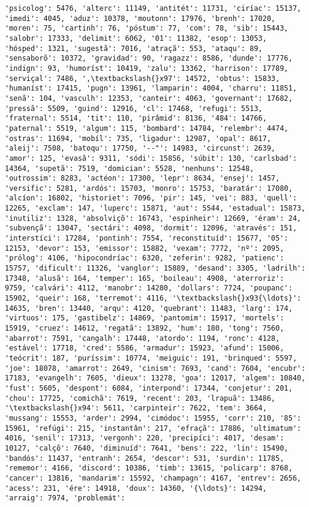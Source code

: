 \documentclass[11pt]{article}
\begin{document}
\begin{Verbatim}[commandchars=\\\{\}]
'psicolog': 5476, 'alterc': 11149, 'antitét': 11731, 'ciríac': 15137, 'imedi': 4045, 'aduz': 10378, 'moutonn': 17976, 'brenh': 17020, 'moren': 75, 'cartinh': 76, 'póstum': 77, 'com': 78, 'sib': 15443, 'salobr': 17333, 'delimit': 6062, '01': 11382, 'esop': 13053, 'hósped': 1321, 'sugestã': 7016, 'atraçã': 553, 'ataqu': 89, 'sensaborõ': 10372, 'gravidad': 90, 'ragazz': 8586, 'dunde': 17776, 'indign': 93, 'humoríst': 10419, 'zalu': 13362, 'harrison': 17789, 'serviçal': 7486, ',\textbackslash{}x97': 14572, 'obtus': 15833, 'humaníst': 17415, 'pugn': 13961, 'lamparin': 4004, 'charru': 11851, 'senã': 104, 'vasculh': 12353, 'canteir': 4063, 'governant': 17682, 'pressã': 5509, 'guind': 12916, 'cl': 17468, 'refugi': 5513, 'fraternal': 5514, 'tit': 110, 'pirâmid': 8136, '484': 14766, 'paternal': 5519, 'algum': 115, 'bombard': 14784, 'relembr': 4474, 'ostras': 11694, 'mobíl': 735, 'ligadur': 12987, 'opal': 8617, 'aleij': 7508, 'batoqu': 17750, '--"': 14983, 'circunst': 2639, 'amor': 125, 'evasã': 9311, 'sódi': 15856, 'súbit': 130, 'carlsbad': 14364, 'supetã': 7519, 'domician': 5528, 'nenhuns': 12548, 'outrossim': 8283, 'actéon': 17300, 'lepr': 8634, 'ensej': 1457, 'versific': 5281, 'ardós': 15703, 'monro': 15753, 'baratár': 17080, 'alcíon': 16802, 'historiet': 7096, 'pir': 145, 'vei': 883, 'quell': 12265, 'exclam': 147, 'luperc': 15871, 'aut': 5544, 'estadual': 15873, 'inutiliz': 1328, 'absolviçõ': 16743, 'espinheir': 12669, 'éram': 24, 'subvençã': 13047, 'sectári': 4098, 'dormit': 12096, 'através': 151, 'interstíci': 17284, 'pontinh': 7554, 'reconstituíd': 15677, '05': 12153, 'devor': 153, 'emissor': 15882, 'vexam': 7772, 'nº': 2095, 'prólog': 4106, 'hipocondríac': 6320, 'zeferin': 9282, 'patienc': 15757, 'dificult': 11326, 'vanglor': 15889, 'desand': 3305, 'ladrilh': 17348, 'alusã': 164, 'temper': 165, 'boileau': 4908, 'aterroriz': 9759, 'calvári': 4112, 'manobr': 14280, 'dollars': 7724, 'poupanc': 15902, 'queir': 168, 'terremot': 4116, '\textbackslash{}x93{\ldots}': 14635, 'bren': 13440, 'arqu': 4120, 'quebrant': 11483, 'larg': 174, 'virtuos': 175, 'gastibelz': 14869, 'pantomim': 15917, 'mortels': 15919, 'cruez': 14612, 'regatã': 13892, 'hum': 180, 'tong': 7560, 'abarrot': 7591, 'cangalh': 17448, 'atordo': 1194, 'ronc': 4128, 'estável': 17718, 'cred': 5586, 'armadur': 15923, 'afund': 15006, 'teócrit': 187, 'puríssim': 10774, 'meiguic': 191, 'brinqued': 5597, 'joe': 18078, 'amarrot': 2649, 'cinism': 7693, 'cand': 7604, 'encubr': 17183, 'evangelh': 7605, 'dieux': 13278, 'goa': 12017, 'algem': 10840, 'fust': 5605, 'despont': 6084, 'interpond': 17344, 'conjetur': 201, 'chou': 17725, 'comichã': 7619, 'recent': 203, 'lrapuã': 13486, '\textbackslash{}x94': 5611, 'carpinteir': 7622, 'tem': 3664, 'mussang': 15553, 'arder': 2994, 'cimódoc': 15955, 'corr': 210, '85': 15961, 'refúgi': 215, 'instantân': 217, 'efraçã': 17886, 'ultimatum': 4016, 'senil': 17313, 'vergonh': 220, 'precipíci': 4017, 'desam': 10127, 'calçõ': 7640, 'diminuíd': 7641, 'bens': 222, 'lin': 15490, 'bandós': 11437, 'entranh': 2654, 'descor': 531, 'surdin': 11785, 'rememor': 4166, 'discord': 10386, 'timb': 13615, 'policarp': 8768, 'cancer': 13816, 'mandarim': 15592, 'champagn': 4167, 'entrev': 2656, 'acess': 231, 'ére': 14918, 'doux': 14360, '{\ldots}': 14294, 'arraig': 7974, 'problemát': 
\end{Verbatim}
\end{document}
